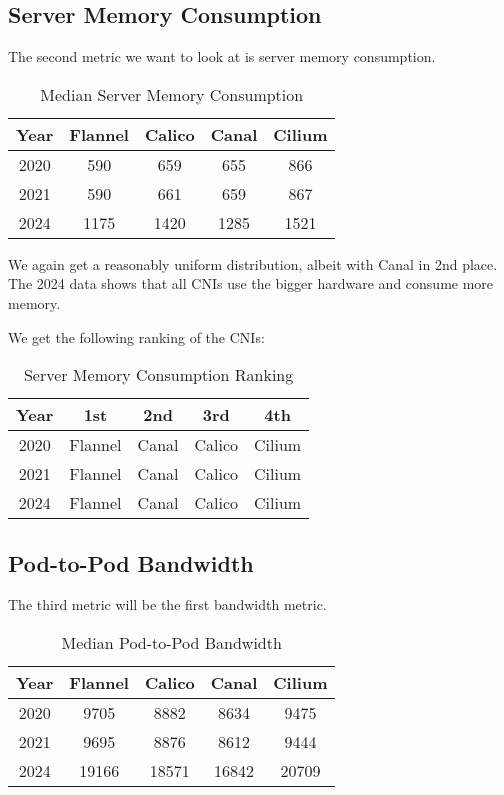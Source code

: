 \subsection{Server Memory Consumption}

The second metric we want to look at is server memory consumption.

\begin{table}[H]
\caption{Median Server Memory Consumption}
\begin{tabular}{|c | c | c | c | c|} 
 \hline
 Year & Flannel & Calico & Canal & Cilium \\
 \hline\hline
 2020 & 590 & 659 & 655 & 866 \\ 
 \hline
 2021 & 590 & 661 & 659 & 867 \\
 \hline
 2024 & 1175 & 1420 & 1285 & 1521 \\
 \hline
\end{tabular}
\label{tab:mem}
\end{table}

We again get a reasonably uniform distribution, albeit with Canal in 2nd place. The 2024 data shows that all CNIs use the bigger hardware and consume more memory.

We get the following ranking of the CNIs:

\begin{table}[H]
\caption{Server Memory Consumption Ranking}
\begin{tabular}{|c | c | c | c | c|} 
 \hline
 Year & 1st & 2nd & 3rd & 4th \\
 \hline\hline
 2020 & Flannel & Canal & Calico & Cilium \\ 
 \hline
 2021 & Flannel & Canal & Calico & Cilium \\
 \hline
 2024 & Flannel & Canal & Calico & Cilium \\
 \hline
\end{tabular}
\label{tab:mem-r}
\end{table}

\subsection{Pod-to-Pod Bandwidth}

The third metric will be the first bandwidth metric.

\begin{table}[H]
\caption{Median Pod-to-Pod Bandwidth}
\begin{tabular}{|c | c | c | c | c|} 
 \hline
 Year & Flannel & Calico & Canal & Cilium \\
 \hline\hline
 2020 & 9705 & 8882 & 8634 & 9475 \\ 
 \hline
 2021 & 9695 & 8876 & 8612 & 9444 \\
 \hline
 2024 & 19166 & 18571 & 16842 & 20709 \\
 \hline
\end{tabular}
\label{tab:p2pbw}
\end{table}

